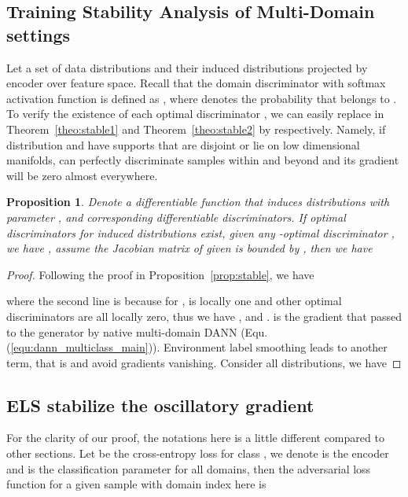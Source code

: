 \documentclass{article} \usepackage{iclr2023_conference,times}
\newtheorem{prop}{Proposition}
\newcommand{\ls}[0]{ELS\xspace}
\newcommand{\myref}[1]{Equ. (\ref{#1})}
\begin{document}
\subsection{Training Stability Analysis of Multi-Domain settings}\label{sec:app_stable_md}
Let  a set of data distributions and  their induced distributions projected by encoder  over feature space. Recall that the domain discriminator with softmax activation function is defined as , where  denotes the probability that  belongs to . To verify the existence of each optimal discriminator , we can easily replace  in Theorem~\ref{theo:stable1} and Theorem~\ref{theo:stable2} by  respectively. Namely, if distribution  and  have supports that are disjoint or lie on low dimensional manifolds,  can perfectly discriminate samples within and beyond  and its gradient will be zero almost everywhere.

\begin{prop}
Denote  a differentiable function that induces distributions  with parameter , and  corresponding differentiable discriminators. If optimal discriminators for induced distributions exist, given any -optimal discriminator , we have , assume the Jacobian matrix of  given  is bounded by , then we have 


\label{prop:stable_md}
\end{prop}
\begin{proof}
Following the proof in Proposition~\ref{prop:stable}, we have

where the second line is because for ,  is locally one and other optimal discriminators  are all locally zero, thus we have , and .  is the gradient that passed to the generator by native multi-domain DANN (\myref{equ:dann_multiclass_main}). Environment label smoothing leads to another term, that is  and avoid gradients vanishing. Consider all distributions, we have


\end{proof}

\subsection{\ls stabilize the oscillatory gradient}\label{app_sec:stable}

For the clarity of our proof, the notations here is a little different compared to other sections. Let  be the cross-entropy loss for class , we denote  is the encoder and  is the classification parameter for all domains, then the adversarial loss function for a given sample  with domain index  here is 
\end{document}
